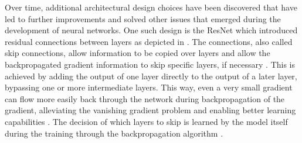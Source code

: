 Over time, additional architectural design choices have been discovered that have led to further improvements and solved other issues that emerged during the development of neural networks.
One such design is the ResNet \cite{he2016DeepResidualLearning} which introduced residual connections between layers as depicted in  \cite{he2016DeepResidualLearning, aggarwal2018NeuralNetworksDeep}.
The connections, also called skip connections, allow information to be copied over layers and allow the backpropagated gradient information to skip specific layers, if necessary \cite{he2016DeepResidualLearning, aggarwal2018NeuralNetworksDeep}.
This is achieved by adding the output of one layer directly to the output of a later layer, bypassing one or more intermediate layers.
This way, even a very small gradient can flow more easily back through the network during backpropagation of the gradient, alleviating the vanishing gradient problem and enabling better learning capabilities \cite{he2016DeepResidualLearning, aggarwal2018NeuralNetworksDeep}.
The decision of which layers to skip is learned by the model itself during the training through the backpropagation algorithm \cite{he2016DeepResidualLearning, aggarwal2018NeuralNetworksDeep}.

